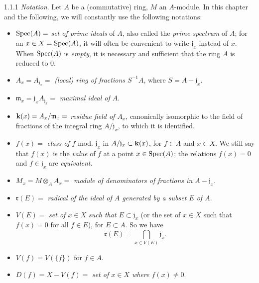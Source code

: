 
\begin{env}{1.1.1}
\label{env-1.1.1.1}
\emph{Notation}. Let $A$ be a (commutative) ring, $M$ an $A$-module. In
this chapter and the following, we will constantly use the following notations:
\begin{itemize}
  \item[] $\operatorname{Spec}(A)=$ \emph{set of prime ideals} of $A$, also called the
          \emph{prime spectrum} of $A$; for an $x\in X=\operatorname{Spec}(A)$, it will often be
          convenient to write $\mathfrak{j}_x$ instead of $x$. When $\operatorname{Spec}(A)$ is
          \emph{empty}, it is necessary and sufficient that the ring $A$ is
          reduced to $0$.
  \item[] $A_x=A_{\mathfrak{j}_x}=$ \emph{(local) ring of fractions $S^{-1}A$},
          where $S=A-\mathfrak{j}_x$.
  \item[] $\mathfrak{m}_x=\mathfrak{j}_x A_{\mathfrak{j}_x}=$ \emph{maximal ideal of $A$}.
  \item[] $\mathbf{k}(x)=A_x/\mathfrak{m}_x=$ \emph{residue field of $A_x$},
          canonically isomorphic to the field of fractions
          of the integral ring $A/\mathfrak{j}_x$, to which it is identified.
  \item[] $f(x)=$ \emph{class of $f$} mod. $\mathfrak{j}_x$ in $A/\mathfrak{j}_x\subset\mathbf{k}(x)$,
          for $f\in A$ and $x\in X$. We still say that $f(x)$ is the \emph{value}
          of $f$ at a point $x\in\operatorname{Spec}(A)$; the relations $f(x)=0$ and $f\in\mathfrak{j}_x$ are
          \emph{equivalent}.
  \item[] $M_x=M\otimes_A A_x=$ \emph{module of denominators of fractions in $A-\mathfrak{j}_x$}.
  \item[] $\mathfrak{r}(E)=$ \emph{radical of the ideal of $A$ generated by a subset $E$ of $A$}.
  \item[] $V(E)=$ \emph{set of $x\in X$ such that $E\subset\mathfrak{j}_x$} (or the set of $x\in X$
          such that $f(x)=0$ for all $f\in E$), for $E\subset A$. So we have
          \[
            \mathfrak{r}(E)=\bigcap_{x\in V(E)}\mathfrak{j}_x.\tag{1.1.1.1}
          \]
  \item[] $V(f)=V(\{f\})$ for $f\in A$.
  \item[] $D(f)=X-V(f)=$ \emph{set of $x\in X$ where $f(x)\neq 0$}.
\end{itemize}
\end{env}

